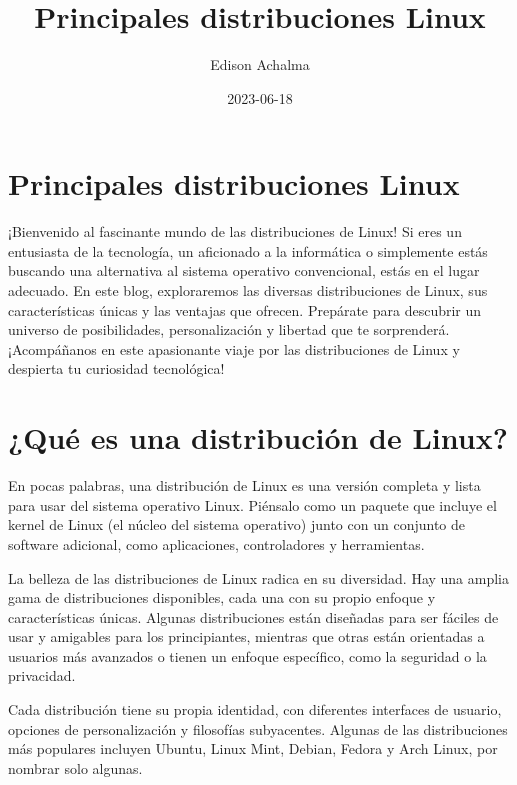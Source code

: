 \documentclass[
  jou,
  floatsintext,
  longtable,
  a4paper,
  nolmodern,
  notxfonts,
  notimes,
  12pt,
  colorlinks=true,linkcolor=blue,citecolor=blue,urlcolor=blue]{apa7}
\title{Principales distribuciones Linux}
\author{Edison Achalma}
\affiliation{
{Escuela Profesional de Economía, Universidad Nacional de San Cristóbal
de Huamanga}}
\date{2023-06-18}
\begin{document}
\maketitle


\hypertarget{toc}{}
\tableofcontents
\newpage
\section[Introduction]{Principales distribuciones Linux}

\setcounter{secnumdepth}{3}

\setlength\LTleft{0pt}




¡Bienvenido al fascinante mundo de las distribuciones de Linux! Si eres
un entusiasta de la tecnología, un aficionado a la informática o
simplemente estás buscando una alternativa al sistema operativo
convencional, estás en el lugar adecuado. En este blog, exploraremos las
diversas distribuciones de Linux, sus características únicas y las
ventajas que ofrecen. Prepárate para descubrir un universo de
posibilidades, personalización y libertad que te sorprenderá.
¡Acompáñanos en este apasionante viaje por las distribuciones de Linux y
despierta tu curiosidad tecnológica!

\section{¿Qué es una distribución de
Linux?}\label{quuxe9-es-una-distribuciuxf3n-de-linux}

En pocas palabras, una distribución de Linux es una versión completa y
lista para usar del sistema operativo Linux. Piénsalo como un paquete
que incluye el kernel de Linux (el núcleo del sistema operativo) junto
con un conjunto de software adicional, como aplicaciones, controladores
y herramientas.

La belleza de las distribuciones de Linux radica en su diversidad. Hay
una amplia gama de distribuciones disponibles, cada una con su propio
enfoque y características únicas. Algunas distribuciones están diseñadas
para ser fáciles de usar y amigables para los principiantes, mientras
que otras están orientadas a usuarios más avanzados o tienen un enfoque
específico, como la seguridad o la privacidad.

Cada distribución tiene su propia identidad, con diferentes interfaces
de usuario, opciones de personalización y filosofías subyacentes.
Algunas de las distribuciones más populares incluyen Ubuntu, Linux Mint,
Debian, Fedora y Arch Linux, por nombrar solo algunas.
\end{document}
